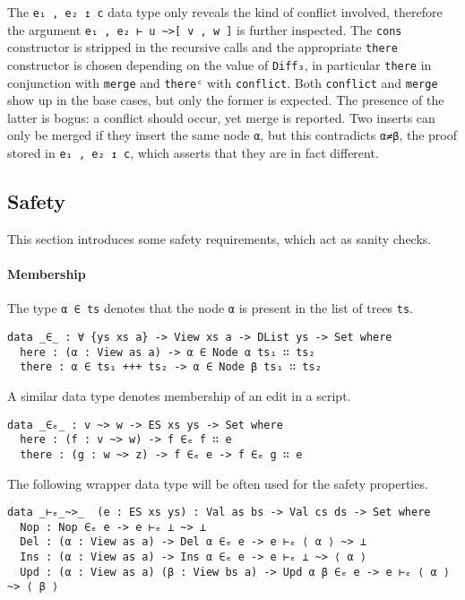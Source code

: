 \documentclass[../Thesis.tex]{subfiles}
\begin{document}
The \texttt{e₁ , e₂ ↥ c} data type only reveals the kind of conflict involved,
therefore the argument \texttt{e₁ , e₂ ⊢ u \textasciitilde>[ v , w ]} 
is further inspected.
The \texttt{cons}  constructor is stripped in the recursive 
calls and the appropriate \texttt{there} constructor is chosen depending on 
the value of \texttt{Diff₃}, in particular \texttt{there} in conjunction with 
\texttt{merge} and \texttt{thereᶜ} with \texttt{conflict}.
Both \texttt{conflict} and \texttt{merge} show up in the base cases, but only
the former is expected.
The presence of the latter is bogus: a conflict should occur, yet merge is reported. Two inserts can only be merged if they insert the same node \texttt{α}, but this contradicts \texttt{α≠β}, the proof stored in 
\texttt{e₁ , e₂ ↥ c}, which asserts that they are in fact different.

	\subsection{Safety}
	\label{subsec:Safety}
	This section introduces some safety requirements, which act as sanity
	checks. 

	\paragraph{Membership}
	\label{par:membership}
	The type \texttt{α ∈ ts} denotes that the node \texttt{α} is present
	in the list of trees \texttt{ts}.

\begin{verbatim}
data _∈_ : ∀ {ys xs a} -> View xs a -> DList ys -> Set where
  here : (α : View as a) -> α ∈ Node α ts₁ ∷ ts₂
  there : α ∈ ts₁ +++ ts₂ -> α ∈ Node β ts₁ ∷ ts₂
\end{verbatim}

A similar data type denotes membership of an edit in a script.

\begin{verbatim}
data _∈ₑ_ : v ~> w -> ES xs ys -> Set where
  here : (f : v ~> w) -> f ∈ₑ f ∷ e
  there : (g : w ~> z) -> f ∈ₑ e -> f ∈ₑ g ∷ e
\end{verbatim}
	
	The following wrapper data type will be often used for the safety properties.

\begin{verbatim}
data _⊢ₑ_~>_  (e : ES xs ys) : Val as bs -> Val cs ds -> Set where
  Nop : Nop ∈ₑ e -> e ⊢ₑ ⊥ ~> ⊥
  Del : (α : View as a) -> Del α ∈ₑ e -> e ⊢ₑ ⟨ α ⟩ ~> ⊥
  Ins : (α : View as a) -> Ins α ∈ₑ e -> e ⊢ₑ ⊥ ~> ⟨ α ⟩
  Upd : (α : View as a) (β : View bs a) -> Upd α β ∈ₑ e -> e ⊢ₑ ⟨ α ⟩ ~> ⟨ β ⟩ 
\end{verbatim}
\end{document}
